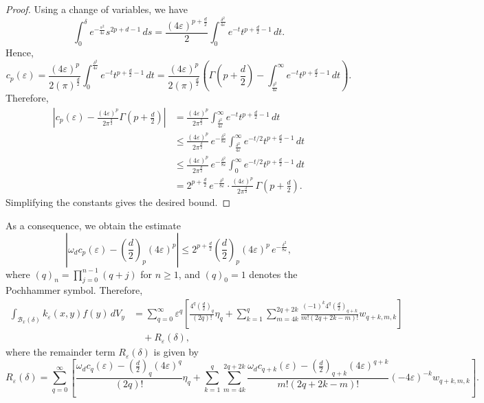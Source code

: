 \documentclass{amsart}
\theoremstyle{Theorem}
\theoremstyle{remark}
\numberwithin{equation}{section} \numberwithin{figure}{section}
\begin{document}
\begin{proof}
Using a change of variables, we have
\[
\int_{0}^{\delta} e^{-\frac{s^{2}}{4\varepsilon}} s^{2p + d - 1} \, ds 
= \frac{(4\varepsilon)^{p + \frac{d}{2}}}{2} \int_{0}^{\frac{\delta^{2}}{4\varepsilon}} e^{-t} t^{p + \frac{d}{2} - 1} \, dt.
\]
Hence,
\[
c_p(\varepsilon) 
= \frac{(4\varepsilon)^p}{2(\pi)^{\frac{d}{2}}} \int_{0}^{\frac{\delta^{2}}{4\varepsilon}} e^{-t} t^{p + \frac{d}{2} - 1} \, dt 
= \frac{(4\varepsilon)^p}{2(\pi)^{\frac{d}{2}}} \left( \Gamma\left(p + \frac{d}{2} \right) - \int_{\frac{\delta^2}{4\varepsilon}}^{\infty} e^{-t} t^{p + \frac{d}{2} - 1} \, dt \right).
\]
Therefore,
\begin{align*}
\left| c_p(\varepsilon) - \frac{(4\varepsilon)^p}{2\pi^{\frac{d}{2}}} \Gamma\left( p + \frac{d}{2} \right) \right| 
&= \frac{(4\varepsilon)^p}{2\pi^{\frac{d}{2}}} \int_{\frac{\delta^2}{4\varepsilon}}^{\infty} e^{-t} t^{p + \frac{d}{2} - 1} \, dt \\
&\leq \frac{(4\varepsilon)^p}{2\pi^{\frac{d}{2}}} \, e^{ -\frac{\delta^2}{8\varepsilon} } \int_{\frac{\delta^2}{4\varepsilon}}^{\infty} e^{-t/2} t^{p + \frac{d}{2} - 1} \, dt \\
&\leq \frac{(4\varepsilon)^p}{2\pi^{\frac{d}{2}}} \, e^{ -\frac{\delta^2}{8\varepsilon} } \int_{0}^{\infty} e^{-t/2} t^{p + \frac{d}{2} - 1} \, dt \\
&=  2^{p + \frac{d}{2}} \, e^{ -\frac{\delta^2}{8\varepsilon} } \cdot \frac{(4\varepsilon)^p}{2\pi^{\frac{d}{2}}} \, \Gamma\left( p + \frac{d}{2} \right).
\end{align*}
Simplifying the constants gives the desired bound.
\end{proof}

As a consequence, we obtain the estimate  
\[
\left| \omega_d c_p(\varepsilon) - \left( \frac{d}{2} \right)_p(4\varepsilon)^p \right|
\leq
2^{p + \frac{d}{2}} \left( \frac{d}{2} \right)_p (4\varepsilon)^p \, e^{- \frac{\delta^2}{8\varepsilon}},
\]
where \( (q)_n = \prod_{j=0}^{n-1} (q + j) \) for \( n \geq 1 \), and \( (q)_0 = 1 \) denotes the Pochhammer symbol.
Therefore,
\begin{align*}
\int_{\mathcal{B}_x(\delta)} k_\varepsilon(x, y) f(y) \, dV_y
&= \sum_{q=0}^{\infty} \varepsilon^q \left[ \frac{4^q  \left( \frac{d}{2} \right)_q}{(2q)!}\eta_{q}
+ \sum_{k=1}^{q} \sum_{m=4k}^{2q+2k} \frac{(-1)^k 4^q \left( \frac{d}{2} \right)_{q+k}}{m!(2q+2k - m)!} w_{q+k, m, k} \right] \\
&\quad + R_\varepsilon(\delta),
\end{align*}
where the remainder term \( R_\varepsilon(\delta) \) is given by
\[
R_\varepsilon(\delta) = \sum_{q=0}^{\infty} \left[ \frac{ \omega_d c_q(\varepsilon) - \left( \frac{d}{2} \right)_q(4\varepsilon)^q }{(2q)!}\eta_{q}
+ \sum_{k=1}^{q} \sum_{m=4k}^{2q+2k} \frac{ \omega_d c_{q+k}(\varepsilon) -\left( \frac{d}{2} \right)_{q+k}(4\varepsilon)^{q+k} }{m!(2q+2k - m)!} (-4\varepsilon)^{-k} w_{q+k, m, k} \right].
\]
\end{document}
